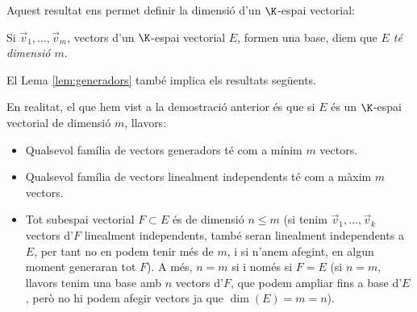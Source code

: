 Aquest resultat ens permet definir la dimensió d'un $\K$-espai vectorial:
\begin{definicio}\label{def:dimensio}
	Si $\vec v_1, \dots, \vec v_m$, vectors d'un $\K$-espai vectorial $E$, formen una base, diem que \emph{$E$ té dimensió $m$}.
\end{definicio}
El Lema \ref{lem:generadors} també implica els resultats següents.



\begin{observacio}
	En realitat, el que hem vist a la demostració anterior és que si $E$ és un $\K$-espai vectorial de dimensió $m$, llavors:
	\begin{itemize}
		\item Qualsevol família de vectors generadors té com a mínim $m$ vectors.
		\item Qualsevol família de vectors linealment independents té com a màxim $m$ vectors.
		\item Tot subespai vectorial $F\subset E$ és de dimensió $n\leq m$ (si tenim $\vec v_1, \dots, \vec v_k$ vectors d'$F$ linealment independents, també seran linealment independents a $E$, per tant no en podem tenir més de $m$, i si n'anem afegint, en algun moment generaran tot $F$). A més, $n=m$ si i només si $F=E$ (si $n=m$, llavors tenim una base amb $n$ vectors d'$F$, que podem ampliar fins a base d'$E$, però no hi podem afegir vectors ja que $\dim(E)=m=n$).
	\end{itemize}
\end{observacio}

